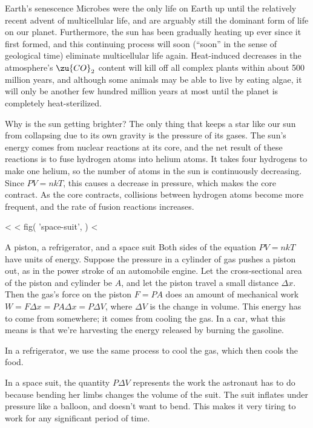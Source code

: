 \begin{eg}{Earth's senescence}
Microbes were the only life on Earth up until the relatively recent
advent of multicellular life, and are arguably still the dominant form
of life on our planet. Furthermore, the sun has been gradually heating
up ever since it first formed, and this continuing process will soon
(``soon'' in the sense of geological time) eliminate multicellular life
again. Heat-induced decreases in the atmosphere's $\zu{CO}_2$ content will
kill off all complex plants within about 500 million years, and
although some animals may be able to live by eating algae, it will only
be another few hundred million years at most until the planet is
completely heat-sterilized.

Why is the sun getting brighter? The only thing that keeps a star
like our sun from collapsing due to its own gravity is the pressure
of its gases. The sun's energy comes from nuclear reactions at its core,
and the net result of these reactions is to fuse hydrogen atoms into
helium atoms. It takes four hydrogens to make one helium,
so the number of atoms in the sun is continuously decreasing. Since
$PV=nkT$, this causes a decrease in pressure, which makes the core
contract. As the core contracts, collisions between hydrogen atoms
become more frequent, and the rate of fusion reactions increases.
\end{eg}


<%
<%
  fig(
    'space-suit',
  )
<%
\begin{eg}{A piston, a refrigerator, and a space suit}\label{eg:p-delta-v}
Both sides of the equation $PV=nkT$ have units of energy.
Suppose the pressure in a cylinder of gas pushes a piston out,
as in the power stroke of an automobile engine. Let the
cross-sectional area of the piston and cylinder be $A$,
and let the piston travel a small distance $\Delta x$. Then
the gas's force on the piston $F=PA$ does an amount of
mechanical work $W=F\Delta x=PA\Delta x=P\Delta V$, where
$\Delta V$ is the change in volume. This energy has to come
from somewhere; it comes from cooling the gas.
In a car, what this means is that we're harvesting
the energy released by burning the gasoline.

In a refrigerator, we use the same process to cool
the gas, which then cools the food.

In a space suit, the quantity $P\Delta V$ represents
the work the astronaut has to do because bending her
limbs changes the volume of the suit. The suit inflates
under pressure like a balloon, and doesn't want to bend.
This makes it very tiring to work for any significant
period of time.
\end{eg}

